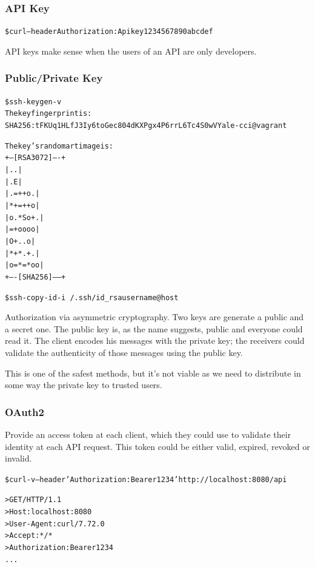 \documentclass[20pt]{style}
\begin{document}
\subsubsection{API Key}
\begin{alltt}
    \$ curl --header Authorization: Apikey 1234567890abcdef
\end{alltt}
API keys make sense when the users of an API are only developers.

\subsubsection{Public/Private Key}
\begin{alltt}
    \$ ssh-keygen -v
    The key fingerprint is:
    SHA256:tFKUq1HLfJ3Iy6toGec804dKXPgx4P6rrL6Tc4S0wVY ale-cci@vagrant

    The key's randomart image is:
    +---[RSA 3072]----+
    |        ..       |
    |       .E        |
    |     . =++ o .   |
    |      *+=++ o    |
    |     o.*So+.     |
    |      =+oooo     |
    |       O+..o     |
    |      *+*.+ .    |
    |     o=*=*oo     |
    +----[SHA256]-----+


    \$ ssh-copy-id -i ~/.ssh/id_rsa username@host
\end{alltt}
Authorization via asymmetric cryptography. Two keys are generate a public and a secret one.
The public key is, as the name suggests, public and everyone could read it.
The client encodes his messages with the private key; the receivers could validate the authenticity of those messages using the public key.

This is one of the safest methods, but it's not viable as we need to distribute in some way the private key to
trusted users.

\subsubsection{OAuth2}
Provide an access token at each client, which they could use to validate their
identity at each API request.  This token could be either valid, expired,
revoked or invalid.

\begin{alltt}
    \$ curl -v --header 'Authorization: Bearer 1234' http://localhost:8080/api

    > GET / HTTP/1.1
    > Host: localhost:8080
    > User-Agent: curl/7.72.0
    > Accept: */*
    > Authorization: Bearer 1234
    ...
\end{alltt}
\end{document}
